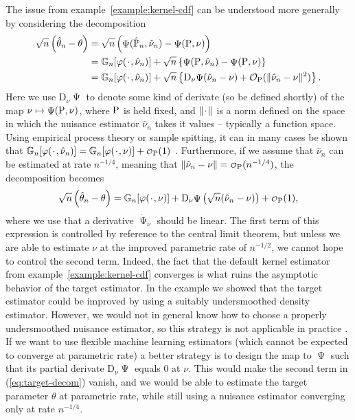\documentclass[a4,danish]{article}
\DeclareMathOperator{\TT}{\Psi}
\begin{document}
The issue from example~\ref{example:kernel-cdf} can be understood more generally by considering the
decomposition
\begin{align*}
  \sqrt{n}
  \left(
  \hat{\theta}_n - \theta
  \right)
  & =  \sqrt{n}
    \left(
    \TT(\empmeas,\hat{\nu}_n) - \TT(\P,\nu)
    \right) \\
  & =
    \G{\phi( \blank, \hat{\nu}_n)}
    + \sqrt{n}
    \left\{
    \TT(\P,\hat{\nu}_n) - \TT(\P,\nu)
    \right\}
  \\
  & = \G{\phi( \blank, \hat{\nu}_n)}
    + \sqrt{n}
    \left\{
    \mathrm{D}_{\nu}{\TT}(\hat{\nu}_n - \nu)
    + \mathcal{O}_{\P}(\Vert \hat{\nu}_n - \nu \Vert^2)
    \right\}.
\end{align*}
Here we use $\mathrm{D}_{\nu}{\TT}$ to denote some kind of derivate (so be defined shortly) of the
map $\nu \mapsto \TT(\P, \nu)$, where $\P$ is held fixed, and $\Vert \blank \Vert$ is a norm defined
on the space in which the nuisance estimator $\hat{\nu}_n$ takes it values -- typically a function
space. Using empirical process theory or sample spitting, it can in many cases be shown that
$\G{\phi( \blank, \hat{\nu}_n)} = \G{\phi( \blank, \nu)} + \smallO_{\P}(1)$
\citep{van1996weak,van2000asymptotic,chernozhukov2018double}. Furthermore, if we assume that
$\hat{\nu}_n$ can be estimated at rate $n^{-1/4}$, meaning that
$\Vert \hat{\nu}_n - \nu \Vert = \smallO_{\P}(n^{-1/4})$, the decomposition becomes
\begin{equation}
  \label{eq:target-decom}
  \sqrt{n}
  \left(
    \hat{\theta}_n - \theta
  \right)
  = \G{\phi( \blank, \nu)}
  + \mathrm{D}_{\nu}{\TT}
  \left(
    \sqrt{n}(\hat{\nu}_n - \nu)
  \right)
  + \smallO_{\P}(1),
\end{equation}
where we use that a derivative $\dot{\TT}_{\nu}$ should be linear. The first term of this expression
is controlled by reference to the central limit theorem, but unless we are able to estimate $\nu$ at
the improved parametric rate of $n^{-1/2}$, we cannot hope to control the second term. Indeed, the
fact that the default kernel estimator from example~\ref{example:kernel-cdf} converges
 is what ruins the asymptotic behavior of the target estimator.
In the example we showed that the target estimator could be improved by using a suitably
undersmoothed density estimator. However, we would not in general know how to choose a properly
undersmoothed nuisance estimator, so this strategy is not applicable in practice . If we want to use flexible machine learning estimators
(which cannot be expected to converge at parametric rate) a better strategy is to design the map to
$\TT$ such that its partial derivate $\mathrm{D}_{\nu}{\TT}$ equals 0 at $\nu$. This would make the
second term in (\ref{eq:target-decom}) vanish, and we would be able to estimate the target parameter
$\theta$ at parametric rate, while still using a nuisance estimator converging only at rate
$n^{-1/4}$.
\end{document}
